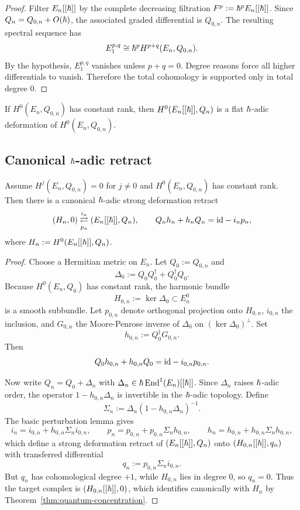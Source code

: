 \begin{proof}
Filter $E_n[[\hbar]]$ by the complete decreasing filtration $F^p:=\hbar^pE_n[[\hbar]]$. Since $Q_n=Q_{0,n}+O(\hbar)$, the associated graded differential is $Q_{0,n}$. The resulting spectral sequence has
\[
 E_1^{p,q}\cong \hbar^p H^{p+q}(E_n,Q_{0,n}).
\]
By the hypothesis, $E_1^{p,q}$ vanishes unless $p+q=0$. Degree reasons force all higher differentials to vanish. Therefore the total cohomology is supported only in total degree $0$.
\end{proof}

\begin{corollary}\label{cor:flat-hbar}
If $H^0(E_n,Q_{0,n})$ has constant rank, then $H^0(E_n[[\hbar]],Q_n)$ is a flat $\hbar$-adic deformation of $H^0(E_n,Q_{0,n})$.
\end{corollary}

\subsection{Canonical $\hbar$-adic retract}

\begin{theorem}\label{thm:canonical-retract}
Assume $H^j(E_n,Q_{0,n})=0$ for $j\neq 0$ and $H^0(E_n,Q_{0,n})$ has constant rank. Then there is a canonical $\hbar$-adic strong deformation retract
\[
 (H_n,0) \underset{p_n}{\stackrel{i_n}{\rightleftarrows}} (E_n[[\hbar]],Q_n),
 \qquad
 Q_n h_n+h_nQ_n = \mathrm{id} - i_np_n,
\]
where $H_n:=H^0(E_n[[\hbar]],Q_n)$.
\end{theorem}

\begin{proof}
Choose a Hermitian metric on $E_n$. Let $Q_0:=Q_{0,n}$ and
\[
 \Delta_0 := Q_0Q_0^{\dagger}+Q_0^{\dagger}Q_0.
\]
Because $H^0(E_n,Q_0)$ has constant rank, the harmonic bundle
\[
 H_{0,n}:=\ker\Delta_0\subset E_n^0
\]
is a smooth subbundle. Let $p_{0,n}$ denote orthogonal projection onto $H_{0,n}$, $i_{0,n}$ the inclusion, and $G_{0,n}$ the Moore-Penrose inverse of $\Delta_0$ on $(\ker\Delta_0)^\perp$. Set
\[
 h_{0,n}:=Q_0^{\dagger}G_{0,n}.
\]
Then
\[
 Q_0h_{0,n}+h_{0,n}Q_0 = \mathrm{id} - i_{0,n}p_{0,n}.
\]

Now write $Q_n=Q_0+\Delta_n$ with $\Delta_n\in \hbar\,\mathrm{End}^1(E_n)[[\hbar]]$. Since $\Delta_n$ raises $\hbar$-adic order, the operator $1-h_{0,n}\Delta_n$ is invertible in the $\hbar$-adic topology. Define
\[
 \Sigma_n := \Delta_n(1-h_{0,n}\Delta_n)^{-1}.
\]
The basic perturbation lemma gives
\[
 i_n=i_{0,n}+h_{0,n}\Sigma_n i_{0,n},
 \qquad
 p_n=p_{0,n}+p_{0,n}\Sigma_n h_{0,n},
 \qquad
 h_n=h_{0,n}+h_{0,n}\Sigma_n h_{0,n},
\]
which define a strong deformation retract of $(E_n[[\hbar]],Q_n)$ onto $(H_{0,n}[[\hbar]],q_n)$ with transferred differential
\[
 q_n:=p_{0,n}\Sigma_n i_{0,n}.
\]
But $q_n$ has cohomological degree $+1$, while $H_{0,n}$ lies in degree $0$, so $q_n=0$. Thus the target complex is $(H_{0,n}[[\hbar]],0)$, which identifies canonically with $H_n$ by Theorem~\ref{thm:quantum-concentration}.
\end{proof}

